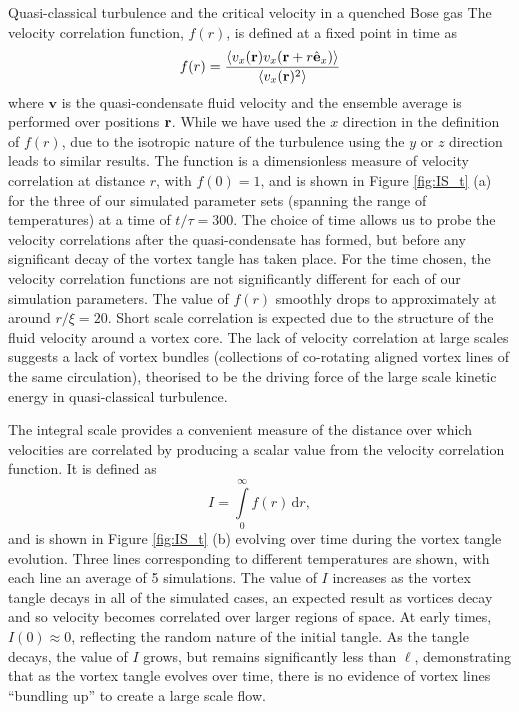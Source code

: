 \begin{chapter}{\label{cha:nonequib}Quasi-classical turbulence and the critical velocity in a quenched Bose gas}
The velocity correlation function, $f(r)$, is defined at a fixed point in time as
\begin{equation}
f(r) = \frac{\langle v_x({\bf r})v_x({\bf r} +  r\hat{\bf e}_x) \rangle}{\langle v_x({\bf r})^2 \rangle}
\end{equation}
where $\mathbf{v}$ is the quasi-condensate fluid velocity and the ensemble average is performed over positions ${\bf r}$. While we have used the $x$ direction in the definition of $f(r)$, due to the isotropic nature of the turbulence using the $y$ or $z$ direction leads to similar results. The function is a dimensionless measure of velocity correlation at distance $r$, with $f(0)=1$, and is shown in Figure \ref{fig:IS_t} (a) for the three of our simulated parameter sets (spanning the range of temperatures) at a time of $t/\tau = 300$. The choice of time allows us to probe the velocity correlations after the quasi-condensate has formed, but before any significant decay of the vortex tangle has taken place. For the time chosen, the velocity correlation functions are not significantly different for each of our simulation parameters. The value of $f(r)$ smoothly drops to approximately at around $r/\xi = 20$. Short scale correlation is expected due to the structure of the fluid velocity around a vortex core. The lack of velocity correlation at large scales suggests a lack of vortex bundles (collections of co-rotating aligned vortex lines of the same circulation), theorised to be the driving force of the large scale kinetic energy in quasi-classical turbulence.

The integral scale provides a convenient measure of the distance over which velocities are correlated by producing a scalar value from the velocity correlation function. It is defined as
\begin{equation}
I = \int\limits_0^\infty\! f(r)\, \mathrm{d}r,
\end{equation}
and is shown in Figure \ref{fig:IS_t} (b) evolving over time during the vortex tangle evolution. Three lines corresponding to different temperatures are shown, with each line an average of 5 simulations. The value of $I$ increases as the vortex tangle decays in all of the simulated cases, an expected result as vortices decay and so velocity becomes correlated over larger regions of space. At early times, $I(0)\approx0$, reflecting the random nature of the initial tangle. As the tangle decays, the value of $I$ grows, but remains significantly less than $\ell$, demonstrating that as the vortex tangle evolves over time, there is no evidence of vortex lines ``bundling up'' to create a large scale flow.


\end{chapter}
